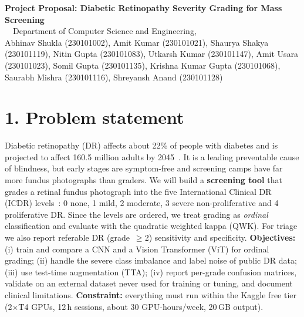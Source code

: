 \documentclass[10pt]{article}
\begin{document}
\begin{center}
{\Large\bfseries Project Proposal: Diabetic Retinopathy Severity Grading for Mass Screening}\\[3pt]
\course\ \textperiodcentered\ Department of Computer Science and Engineering, \institute\\[2pt]
\small Abhinav Shukla (230101002), Amit Kumar (230101021), Shaurya Shakya (230101119), Nitin Gupta (230101083),
Utkarsh Kumar (230101147), Amit Usara (230101023), Somil Gupta (230101135), Krishna Kumar Gupta (230101068),
Saurabh Mishra (230101116), Shreyansh Anand (230101128)
\end{center}

\section*{1. Problem statement}
Diabetic retinopathy (DR) affects about 22\% of people with diabetes and is projected to affect 160.5 million adults by 2045~\cite{teo}.
It is a leading preventable cause of blindness, but early stages are symptom-free and screening camps have far more fundus photographs than graders.
We will build a \textbf{screening tool} that grades a retinal fundus photograph into the five International Clinical DR (ICDR) levels~\cite{icdr}:
0 none, 1 mild, 2 moderate, 3 severe non-proliferative and 4 proliferative DR.
Since the levels are ordered, we treat grading as \emph{ordinal} classification and evaluate with the quadratic weighted kappa (QWK).
For triage we also report referable DR (grade~$\ge$2) sensitivity and specificity.
\textbf{Objectives:}
(i) train and compare a CNN and a Vision Transformer (ViT) for ordinal grading;
(ii) handle the severe class imbalance and label noise of public DR data;
(iii) use test-time augmentation (TTA);
(iv) report per-grade confusion matrices, validate on an external dataset never used for training or tuning, and document clinical limitations.
\textbf{Constraint:} everything must run within the Kaggle free tier (2$\times$T4 GPUs, 12\,h sessions, about 30 GPU-hours/week, 20\,GB output).
\end{document}
